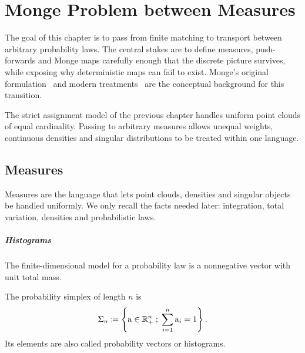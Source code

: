 
\chapter{Monge Problem between Measures}
\label{sec-monge}

The goal of this chapter is to pass from finite matching to transport between arbitrary probability laws. The central stakes are to define measures, push-forwards and Monge maps carefully enough that the discrete picture survives, while exposing why deterministic maps can fail to exist. Monge's original formulation~\cite{Monge1781} and modern treatments~\cite{Villani03,Villani09,SantambrogioBook,rachev1998mass} are the conceptual background for this transition.

The strict assignment model of the previous chapter handles uniform point clouds of equal cardinality. Passing to arbitrary measures allows unequal weights, continuous densities and singular distributions to be treated within one language.

\section{Measures}
\label{sec-measures}

Measures are the language that lets point clouds, densities and singular objects be handled uniformly. We only recall the facts needed later: integration, total variation, densities and probabilistic laws.

\paragraph{Histograms}

The finite-dimensional model for a probability law is a nonnegative vector with unit total mass.

\begin{defn}\label{def-probability-simplex}
	The probability simplex of length $n$ is
	\[
		\Sigma_n \coloneqq \left\{ \mathrm{a} \in \mathbb{R}_+^n \;;\;  \sum_{i=1}^n \mathrm{a}_i = 1  \right\}.
	\]
	Its elements are also called probability vectors or histograms.
\end{defn}

